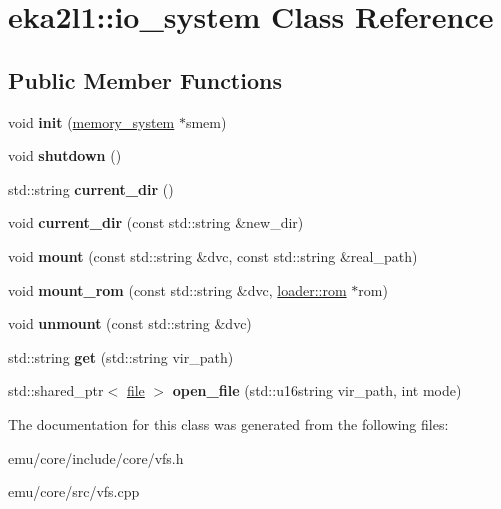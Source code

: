 \hypertarget{classeka2l1_1_1io__system}{}\section{eka2l1\+:\+:io\+\_\+system Class Reference}
\label{classeka2l1_1_1io__system}
\subsection*{Public Member Functions}
\begin{DoxyCompactItemize}
\item 
\mbox{\label{classeka2l1_1_1io__system_a5d3fd0594bcebc7c3a5372530bc653b0}} 
void {\bfseries init} (\mbox{\hyperlink{classeka2l1_1_1memory__system}{memory\+\_\+system}} $\ast$smem)
\item 
\mbox{\label{classeka2l1_1_1io__system_ae3a6b69e0a9b76b6558a1a750378f830}} 
void {\bfseries shutdown} ()
\item 
\mbox{\label{classeka2l1_1_1io__system_a6bd29eb1a81606e5bc174c287dedaa11}} 
std\+::string {\bfseries current\+\_\+dir} ()
\item 
\mbox{\label{classeka2l1_1_1io__system_a95ca2d8addf384142082ce59a1eddb20}} 
void {\bfseries current\+\_\+dir} (const std\+::string \&new\+\_\+dir)
\item 
\mbox{\label{classeka2l1_1_1io__system_a2de19384ccc6f0087e57656d950e4204}} 
void {\bfseries mount} (const std\+::string \&dvc, const std\+::string \&real\+\_\+path)
\item 
\mbox{\label{classeka2l1_1_1io__system_a5da23bc762d2558ec09c251c6a5719d1}} 
void {\bfseries mount\+\_\+rom} (const std\+::string \&dvc, \mbox{\hyperlink{structeka2l1_1_1loader_1_1rom}{loader\+::rom}} $\ast$rom)
\item 
\mbox{\label{classeka2l1_1_1io__system_aea342e6467267496c23befc6262e8081}} 
void {\bfseries unmount} (const std\+::string \&dvc)
\item 
\mbox{\label{classeka2l1_1_1io__system_a72a595c69936d7630fa030c524490493}} 
std\+::string {\bfseries get} (std\+::string vir\+\_\+path)
\item 
\mbox{\label{classeka2l1_1_1io__system_a6b87ab47a1ee43bfd57a47fa16821526}} 
std\+::shared\+\_\+ptr$<$ \mbox{\hyperlink{structeka2l1_1_1file}{file}} $>$ {\bfseries open\+\_\+file} (std\+::u16string vir\+\_\+path, int mode)
\end{DoxyCompactItemize}


The documentation for this class was generated from the following files\+:\begin{DoxyCompactItemize}
\item 
emu/core/include/core/vfs.\+h\item 
emu/core/src/vfs.\+cpp\end{DoxyCompactItemize}
